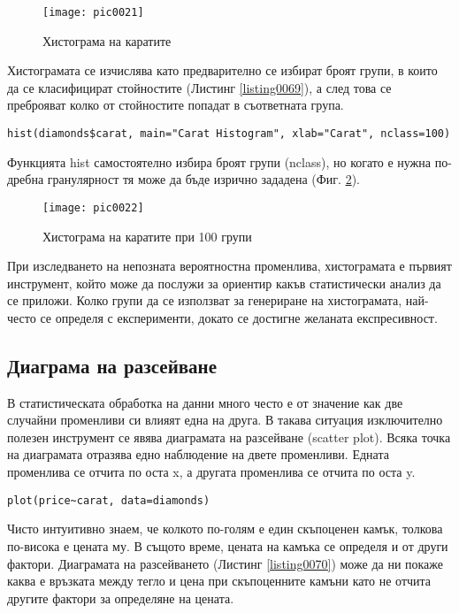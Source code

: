 \begin{figure}[h!]
  \centering
  \texttt{[image: pic0021]}
  \caption{Хистограма на каратите}
\label{figure0021}
\end{figure}
\FloatBarrier

Хистограмата се изчислява като предварително се избират броят групи, в които да се класифицират стойностите (Листинг \ref{listing0069}), а след това се преброяват колко от стойностите попадат в съответната група.

\begin{lstlisting}[caption=Хистограма с повече групи, label=listing0069]
hist(diamonds$carat, main="Carat Histogram", xlab="Carat", nclass=100)
\end{lstlisting}

Функцията hist самостоятелно избира броят групи (nclass), но когато е нужна по-дребна гранулярност тя може да бъде изрично зададена (Фиг. \ref{figure0022}).

\begin{figure}[h!]
  \centering
  \texttt{[image: pic0022]}
  \caption{Хистограма на каратите при 100 групи}
\label{figure0022}
\end{figure}
\FloatBarrier

При изследването на непозната вероятностна променлива, хистограмата е първият инструмент, който може да послужи за ориентир какъв статистически анализ да се приложи. Колко групи да се използват за генериране на хистограмата, най-често се определя с експерименти, докато се достигне желаната експресивност.

\subsection{Диаграма на разсейване}

В статистическата обработка на данни много често е от значение как две случайни променливи си влияят една на друга. В такава ситуация изключително полезен инструмент се явява диаграмата на разсейване (scatter plot). Всяка точка на диаграмата отразява едно наблюдение на двете променливи. Едната променлива се отчита по оста x, а другата променлива се отчита по оста y.

\begin{lstlisting}[caption=Генериране на диаграма на разсейване, label=listing0070]
plot(price~carat, data=diamonds)
\end{lstlisting}

Чисто интуитивно знаем, че колкото по-голям е един скъпоценен камък, толкова по-висока е цената му. В същото време, цената на камъка се определя и от други фактори. Диаграмата на разсейването (Листинг \ref{listing0070}) може да ни покаже каква е връзката между тегло и цена при скъпоценните камъни като не отчита другите фактори за определяне на цената.

